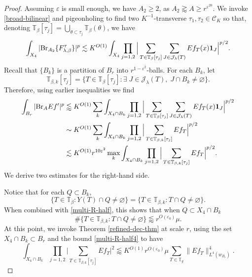 \documentclass{amsart}%
\numberwithin{equation}{section}
\newcommand{\be}{\beta}
\newcommand{\e}{\varepsilon}
\newcommand{\la}{\lambda}
\newcommand{\cj}{\mathcal J}
\newcommand{\ZT}{\mathbb{T}}
\newcommand{\Id}{{\bf{1}}}
\newcommand{\cC}{{\mathcal C}}
\newcommand{\Br}{{\rm{Br}}}
\newcommand{\1}{\mathbbm{1}}
\begin{document}
\begin{proof}
	Assuming $\e$ is small enough, we have $A_2\ge 2$, as $A_2\gtrapprox A\ge r^{\e^{20}}$.
	We invoke \eqref{broad-bilinear} and pigeonholing to find two $K^{-1}$-transverse $\tau_1,\tau_2\in\cC_K$ so that, denoting $\ZT_{\be}[\tau_j]=\bigcup_{\theta\subset\tau_j}\ZT_{\be}(\theta)$, we have
	\begin{align}
		\nonumber
        \int_{X_4}|\Br_{A_2} \{F_{\lambda,\beta}^{\tau}\}|^p
		\lesssim K^{O(1)}\int_{ X_4}\prod_{j=1,2}\Big|\sum_{T\in\ZT_{\be}[\tau_j]}\sum_{J\in\cj_{\la}(T)}Ef_{T}(x)\Id_J\Big|^{p/2}.
	\end{align}
	Recall that $\{B_k\}$ is a partition of $B_r$ into $r^{1-\e^2}$-balls. 
	For each $B_k$, let $$\ZT_{\be, k}[\tau_j]=\{T\in\ZT_{\be}[\tau_j]: \exists \;J\in\cj_{\la}(T),\; J\cap B_k\not=\varnothing\}.$$
	Therefore, using earlier inequalities we find
	\begin{align}
		\label{X-4}
		\int_{B_r}|\Br_{A} Ef'|^p&\lessapprox K^{O(1)} \sum_k\int_{X_4\cap B_k}\prod_{j=1,2}\Big|\sum_{T\in\ZT_{\be}[\tau_j]}\sum_{J\in\cj_{\la}(T)}Ef_{T}(x)\Id_J\Big|^{p/2}\\ \nonumber
		&\sim K^{O(1)}\sum_k\int_{X_4\cap B_k}\prod_{j=1,2}\Big|\sum_{T\in\ZT_{\be, k}[\tau_j]}Ef_{T}\Big|^{p/2}\\ 
        \nonumber
		&\lesssim  K^{O(1)} r^{10\e^2}\max_k\int_{X_4\cap B_k}\prod_{j=1,2}\Big|\sum_{T\in\ZT_{\be, k}[\tau_j]}Ef_{T}\Big|^{p/2}.
	\end{align}
    We derive two estimates for the right-hand side. 
    
	Notice that for each $Q\subset B_k$,
	\begin{equation}
		\nonumber
		\{T\in\ZT_{\be}:Y(T)\cap Q\not=\varnothing\}=\{T\in\ZT_{\be,k}:T\cap Q\not=\varnothing\}.
	\end{equation}
    When combined with \eqref{multi-R-half}, this shows that when $Q\subset X_4\cap B_k$
    \begin{equation}
    \label{multi-R-half4}
    \#\{T\in\ZT_{\be, k}:T\cap Q\not=\varnothing\}\lessapprox r^{O(\e_0)}\mu.
    \end{equation}
	At this point, we invoke Theorem \ref{refined-dec-thm} at scale $r$, using the set $X_4\cap B_k\subset B_r$ and  the bound \eqref{multi-R-half4}  to have
	\begin{equation}
		\label{jkijurgu98tug8tug89t}
		\int_{X_4\cap B_k}\prod_{j=1,2}\Big|\sum_{T\in\ZT_{\be, k}[\tau_j]}Ef_{T}\Big|^2\lessapprox K^{O(1)} r^{O(\e_0)} \mu\sum_{T\in\ZT_g}\big\|Ef_T\big\|_{L^4(w_{B_r})}^4.
	\end{equation}
	

\end{proof}
\end{document}
